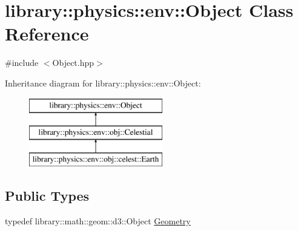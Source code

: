 \hypertarget{classlibrary_1_1physics_1_1env_1_1_object}{}\section{library\+:\+:physics\+:\+:env\+:\+:Object Class Reference}
\label{classlibrary_1_1physics_1_1env_1_1_object}


{\ttfamily \#include $<$Object.\+hpp$>$}

Inheritance diagram for library\+:\+:physics\+:\+:env\+:\+:Object\+:\begin{figure}[H]
\begin{center}
\leavevmode
\includegraphics[height=3.000000cm]{classlibrary_1_1physics_1_1env_1_1_object}
\end{center}
\end{figure}
\subsection*{Public Types}
\begin{DoxyCompactItemize}
\item 
typedef library\+::math\+::geom\+::d3\+::\+Object \hyperlink{classlibrary_1_1physics_1_1env_1_1_object_a750fd821b17667fec9e0a4eda23af048}{Geometry}
\end{DoxyCompactItemize}
